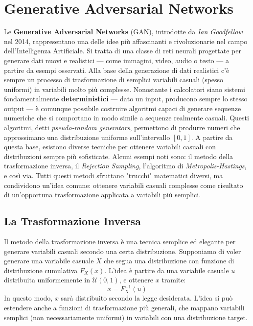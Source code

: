 \chapter{Generative Adversarial Networks}

Le \textbf{Generative Adversarial Networks} (GAN), introdotte da \textit{Ian Goodfellow} nel 2014, rappresentano una delle idee più affascinanti e rivoluzionarie nel campo dell’Intelligenza Artificiale. Si tratta di una classe di reti neurali progettate per generare dati nuovi e realistici — come immagini, video, audio o testo — a partire da esempi osservati. Alla base della generazione di dati realistici c’è sempre un processo di trasformazione di semplici variabili casuali (spesso uniformi) in variabili molto più complesse. Nonostante i calcolatori siano sistemi fondamentalmente \textbf{deterministici} — dato un input, producono sempre lo stesso output — è comunque possibile costruire algoritmi capaci di generare sequenze numeriche che si comportano in modo simile a sequenze realmente casuali. Questi algoritmi, detti \textit{pseudo-random generators}, permettono di produrre numeri che approssimano una distribuzione uniforme sull’intervallo $[0,1]$. A partire da questa base, esistono diverse tecniche per ottenere variabili casuali con distribuzioni sempre più sofisticate. Alcuni esempi noti sono: il metodo della trasformazione inversa, il \textit{Rejection Sampling}, l’algoritmo di \textit{Metropolis-Hastings}, e così via. Tutti questi metodi sfruttano "trucchi" matematici diversi, ma condividono un'idea comune: ottenere variabili casuali complesse come risultato di un'opportuna trasformazione applicata a variabili più semplici.

\section{La Trasformazione Inversa}

Il metodo della trasformazione inversa è una tecnica semplice ed elegante per generare variabili casuali secondo una certa distribuzione. Supponiamo di voler generare una variabile casuale $X$ che segua una distribuzione con funzione di distribuzione cumulativa $F_X(x)$. L’idea è partire da una variabile casuale $u$ distribuita uniformemente in $\mathcal{U}(0,1)$, e ottenere $x$ tramite:
\begin{equation}
    x = F_X^{-1}(u)
\end{equation}
In questo modo, $x$ sarà distribuito secondo la legge desiderata. L’idea si può estendere anche a funzioni di trasformazione più generali, che mappano variabili semplici (non necessariamente uniformi) in variabili con una distribuzione target.

